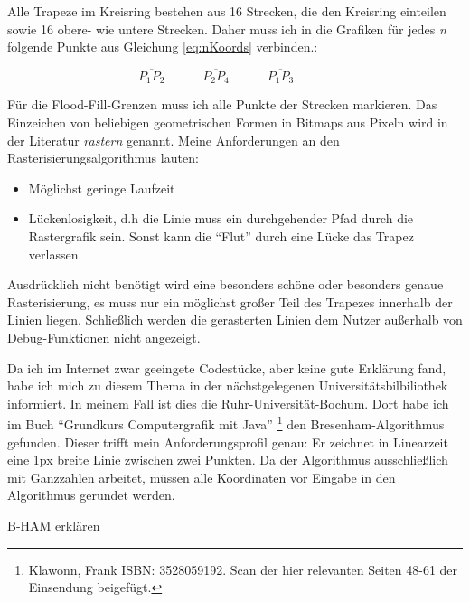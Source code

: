 	Alle Trapeze im Kreisring bestehen aus 16 Strecken, die den Kreisring einteilen sowie 16 obere- wie untere Strecken. Daher muss ich in die Grafiken für jedes \textit{n} folgende Punkte aus Gleichung \eqref{eq:nKoords} verbinden.:
	
	\begin{equation}
		\overline{P_1P_2} \hspace{3em}
		\overline{P_2P_4} \hspace{3em}
		\overline{P_1P_3} \hspace{3em}
	\end{equation}

	Für die Flood-Fill-Grenzen muss ich alle Punkte der Strecken markieren. Das Einzeichen von beliebigen geometrischen Formen in Bitmaps aus Pixeln wird in der Literatur \textit{rastern} genannt. Meine Anforderungen an den Rasterisierungsalgorithmus lauten:
	\begin{itemize}
		\item Möglichst geringe Laufzeit
		\item Lückenlosigkeit, d.h die Linie muss ein durchgehender Pfad durch die Rastergrafik sein. Sonst kann die "`Flut"' durch eine Lücke das Trapez verlassen.
	\end{itemize}
	Ausdrücklich nicht benötigt wird eine besonders schöne oder besonders genaue Rasterisierung, es muss nur ein möglichst großer Teil des Trapezes innerhalb der Linien liegen. Schließlich werden die gerasterten Linien dem Nutzer außerhalb von Debug-Funktionen nicht angezeigt.

	Da ich im Internet zwar geeingete Codestücke, aber keine gute Erklärung fand, habe ich mich zu diesem Thema in der nächstgelegenen Universitätsbilbiliothek informiert. In meinem Fall ist dies die Ruhr-Universität-Bochum. Dort habe ich im Buch "`Grundkurs Computergrafik mit Java"' \footnote{Klawonn, Frank ISBN: 3528059192. Scan der hier relevanten Seiten 48-61 der Einsendung beigefügt.} den Bresenham-Algorithmus gefunden. Dieser trifft mein Anforderungsprofil genau: Er zeichnet in Linearzeit eine 1px breite Linie zwischen zwei Punkten. Da der Algorithmus ausschließlich mit Ganzzahlen arbeitet, müssen alle Koordinaten vor Eingabe in den Algorithmus gerundet werden.

B-HAM erklären
